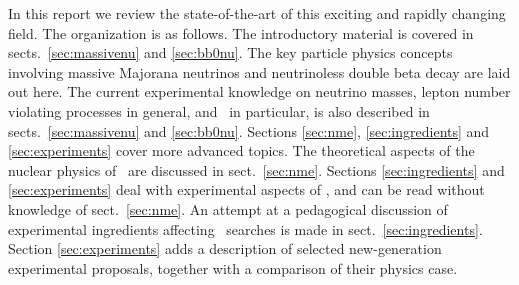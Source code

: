 In this report we review the state-of-the-art of this exciting and rapidly changing field. 
The organization is as follows. The introductory material is covered in sects.~\ref{sec:massivenu} and \ref{sec:bb0nu}. The key particle physics concepts involving massive Majorana neutrinos and neutrinoless double beta decay are laid out here. The current experimental knowledge on neutrino masses, lepton number violating processes in general, and \bbonu\ in particular, is also described in sects.~\ref{sec:massivenu} and \ref{sec:bb0nu}. Sections \ref{sec:nme}, \ref{sec:ingredients} and \ref{sec:experiments} cover more advanced topics. The theoretical aspects of the nuclear physics of \bbonu\ are discussed in sect.~\ref{sec:nme}. Sections \ref{sec:ingredients} and \ref{sec:experiments} deal with experimental aspects of \bbonu, and can be read without knowledge of sect.~\ref{sec:nme}. An attempt at a pedagogical discussion of experimental ingredients affecting \bbonu\ searches is made in sect.~\ref{sec:ingredients}. Section \ref{sec:experiments} adds a description of selected new-generation experimental proposals, together with a comparison of their physics case. 

